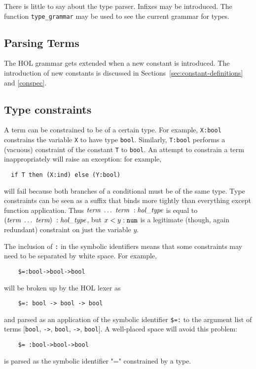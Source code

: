 {There is little to say about the type parser. Infixes may be introduced.
The function \verb+type_grammar+ may be used to see the current grammar
for types.

\subsection{Parsing Terms}

The HOL grammar gets extended when a new constant is introduced. The
introduction of new constants is discussed in
Sections~\ref{sec:constant-definitions} and \ref{conspec}.

\subsection{Type constraints}

A term can be constrained to be of a certain type.  For example,
\verb+X:bool+ constrains the variable \verb+X+ to have type
\verb+bool+. Similarly, \verb+T:bool+ performs a (vacuous) constraint
of the constant \verb+T+ to \verb+bool+. An attempt to constrain a
term inappropriately will raise an exception: for example,
\begin{verbatim}
  if T then (X:ind) else (Y:bool)
\end{verbatim}
will fail because both branches of a conditional must be of the same
type.  Type constraints can be seen as a suffix that binds more
tightly than everything except function application.  Thus $\mbox{\it term}\
\ldots\ \mbox{\it term} \ : \mbox{\it hol\_type}$ is equal to $(\mbox{\it term}\ \ldots\ \mbox{\it term})\ :
\mbox{\it hol\_type}$, but $x < y:\mbox{\tt num}$ is a legitimate (though, again
redundant) constraint on just the variable $y$.

The inclusion of \verb+:+ in the symbolic identifiers means that some
constraints may need to be separated by white space. For example,
\begin{verbatim}
    $=:bool->bool->bool
\end{verbatim}
will be broken up by the HOL lexer as
\begin{verbatim}
    $=: bool -> bool -> bool
\end{verbatim}
and parsed as an application of the symbolic identifier \verb+$=:+ to
the argument list of terms [\verb+bool+, \verb+->+, \verb+bool+,
\verb+->+, \verb+bool+]. A well-placed space will avoid this problem:
\begin{verbatim}
    $= :bool->bool->bool
\end{verbatim}
is parsed as the symbolic identifier "=" constrained by a type.

}
